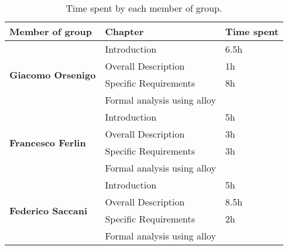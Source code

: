 \begin{table}[H]
      \centering
      \begin{tabular}{|l|l|l|}
            \hline
            \textbf{Member of group }                  & \textbf{Chapter}            & \textbf{Time spent} \\\hline
            \multirow{4}{*}{\textbf{Giacomo Orsenigo}} & Introduction                & 6.5h                \\
                                                       & Overall Description         & 1h                  \\
                                                       & Specific Requirements       & 8h                  \\
                                                       & Formal analysis using alloy &                     \\\hline
            \multirow{4}{*}{\textbf{Francesco Ferlin}} & Introduction                & 5h                  \\
                                                       & Overall Description         & 3h                  \\
                                                       & Specific Requirements       & 3h                  \\
                                                       & Formal analysis using alloy &                     \\\hline
            \multirow{4}{*}{\textbf{Federico Saccani}} & Introduction                & 5h                  \\
                                                       & Overall Description         & 8.5h                \\
                                                       & Specific Requirements       & 2h                  \\
                                                       & Formal analysis using alloy &                     \\\hline
      \end{tabular}
      \caption{Time spent by each member of group.}
      \label{table:Time spent}
\end{table}
